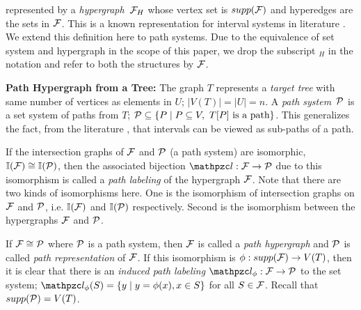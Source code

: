  represented by a {\em
  hypergraph}\, ${\cal F}_H$ whose vertex set is $supp({\cal F})$ and hyperedges
are the sets in ${\cal F}$. This is a known representation for interval
systems in literature \cite{bls99,kklv10}.  We extend this definition
here to path systems. Due to the equivalence of set system and
hypergraph in the scope of this paper, we drop the subscript $_H$ in
the notation and refer to both the structures by ${\cal F}$.

{\bf Path Hypergraph from a Tree:} The graph $T$ represents a {\em
  target tree} with same number of vertices as elements in $U$;
$|V(T)|=|U|=n$.  A {\em path system}\, ${\cal P}$ is a set system of paths
from $T$; ${\cal P} \subseteq \{P \mid P \subseteq V, \text{ } T[P] \text{
  is a path} \}$.  This generalizes the fact, from the literature
\cite{bls99,kklv10}, that intervals can be viewed as sub-paths of a
path.


If the intersection graphs of ${\cal F}$ and ${\cal P}$ (a path system) are
isomorphic, $\mathbb I({\cal F}) \cong \mathbb I({\cal P})$, then the associated bijection
$\cl: \cF \rightarrow \cP$ due to this isomorphism is called a {\em
  path labeling} of the hypergraph ${\cal F}$.  Note that there are two
kinds of isomorphisms here.  One is the isomorphism of intersection
graphs on ${\cal F}$ and ${\cal P}$, i.e. $\mathbb I({\cal F})$ and $\mathbb I({\cal P})$
respectively. Second is the isomorphism between the hypergraphs ${\cal F}$
and ${\cal P}$.


If ${\cal F} \cong {\cal P}$ where ${\cal P}$ is a path system, then ${\cal F}$ is called
a {\em path hypergraph} and ${\cal P}$ is called {\em path representation}
of ${\cal F}$. If this isomorphism is $\phi: supp({\cal F}) \rightarrow V(T)$,
then it is clear that there is an {\em induced path labeling}
$\cl_\phi: \cF \rightarrow \cP$ to the set system; $\cl_\phi(S) =
\set{y \mid y = \phi(x), x \in S}$ for all $S \in {\cal F}$. Recall that
$supp({\cal P}) = V(T)$.

